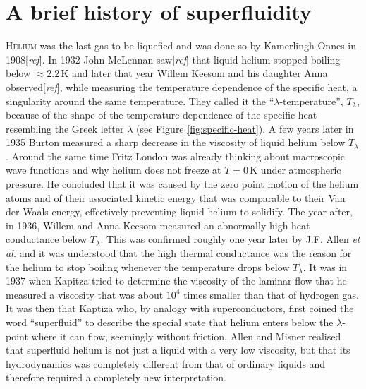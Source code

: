 \documentclass[12pt,a4paper]{book}
\newcommand{\unit}[1]{\,\mathrm{#1}}
\begin{document}
	\section{A brief history of superfluidity}
		\lettrine[lines=3,findent=3pt,nindent=0pt]{H}{elium} was the last gas to be liquefied and was done so by Kamerlingh Onnes in 1908[\emph{ref}]. In 1932 John McLennan saw[\emph{ref}] that liquid helium stopped boiling below $\approx\!2.2\unit{K}$ and later that year Willem Keesom and his daughter Anna observed[\emph{ref}], while measuring  the temperature dependence of the specific heat, a singularity around the same temperature. They called it the ``$\lambda$-temperature'',  $T_\lambda$, because of the shape of the temperature dependence of the specific heat resembling the Greek letter $\lambda$ (see Figure \ref{fig:specific-heat}). A few years later in 1935 Burton measured a sharp decrease in the viscosity of liquid helium below $T_\lambda$. Around the same time Fritz London was already thinking about macroscopic wave functions and why helium does not freeze at $T=0\unit{K}$ under atmospheric pressure. He concluded that it was caused by the zero point motion of the helium atoms and of their associated kinetic energy that was comparable to their Van der Waals energy, effectively preventing liquid helium to solidify. The year after, in 1936, Willem and Anna Keesom measured an abnormally high heat conductance below $T_\lambda$. This was confirmed roughly one year later by J.F. Allen \emph{et al.} and it was understood that the high thermal conductance was the reason for the helium to stop boiling whenever the temperature drops below $T_\lambda$. It was in 1937 when Kapitza tried to determine the viscosity of the laminar flow that he measured a viscosity that was about $10^4$ times smaller than that of hydrogen gas. It was then that Kaptiza who, by analogy with superconductors, first coined the word ``superfluid'' to describe the special state that helium enters below the $\lambda$-point where it can flow, seemingly without friction. Allen and Misner realised that superfluid helium is not just a liquid with a very low viscosity, but that its hydrodynamics was completely different from that of ordinary liquids and therefore required a completely new interpretation.\\
		
\end{document}

